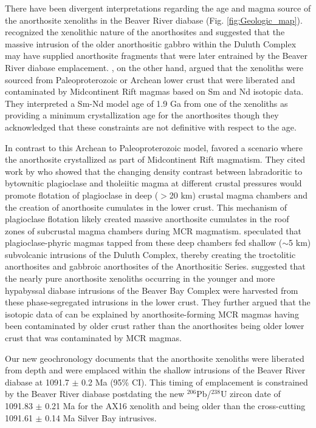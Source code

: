 There have been divergent interpretations regarding the age and magma source of the anorthosite xenoliths in the Beaver River diabase (Fig. \ref{fig:Geologic_map}).  recognized the xenolithic nature of the anorthosites and suggested that the massive intrusion of the older anorthositic gabbro within the Duluth Complex may have supplied anorthosite fragments that were later entrained by the Beaver River diabase emplacement. , on the other hand, argued that the xenoliths were sourced from Paleoproterozoic or Archean lower crust that were liberated and contaminated by Midcontinent Rift magmas based on Sm and Nd isotopic data. They interpreted a Sm-Nd model age of 1.9 Ga from one of the xenoliths as providing a minimum crystallization age for the anorthosites though they acknowledged that these constraints are not definitive with respect to the age. 

In contrast to this Archean to Paleoproterozoic model,  favored a scenario where the anorthosite crystallized as part of Midcontinent Rift magmatism. They cited work by  who showed that the changing density contrast between labradoritic to bytownitic plagioclase and tholeiitic magma at different crustal pressures would promote flotation of plagioclase in deep ($>$20 km) crustal magma chambers and the creation of anorthosite cumulates in the lower crust. This mechanism of plagioclase flotation likely created massive anorthosite cumulates in the roof zones of subcrustal magma chambers during MCR magmatism.  speculated that plagioclase-phyric magmas tapped from these deep chambers fed shallow ($\sim$5 km) subvolcanic intrusions of the Duluth Complex, thereby creating the troctolitic anorthosites and gabbroic anorthosites of the Anorthositic Series.  suggested that the nearly pure anorthosite xenoliths occurring in the younger and more hypabyssal diabase intrusions of the Beaver Bay Complex were harvested from these phase-segregated intrusions in the lower crust. They further argued that the isotopic data of  can be explained by anorthosite-forming MCR magmas having been contaminated by older crust rather than the anorthosites being older lower crust that was contaminated by MCR magmas.

Our new geochronology documents that the anorthosite xenoliths were liberated from depth and were emplaced within the shallow intrusions of the Beaver River diabase at 1091.7 $\pm$ 0.2 Ma (95\% CI). This timing of emplacement is constrained by the Beaver River diabase postdating the new $^{206}$Pb/$^{238}$U zircon date of 1091.83 $\pm$ 0.21 Ma for the AX16 xenolith and being older than the cross-cutting 1091.61 $\pm$ 0.14 Ma Silver Bay intrusives.

